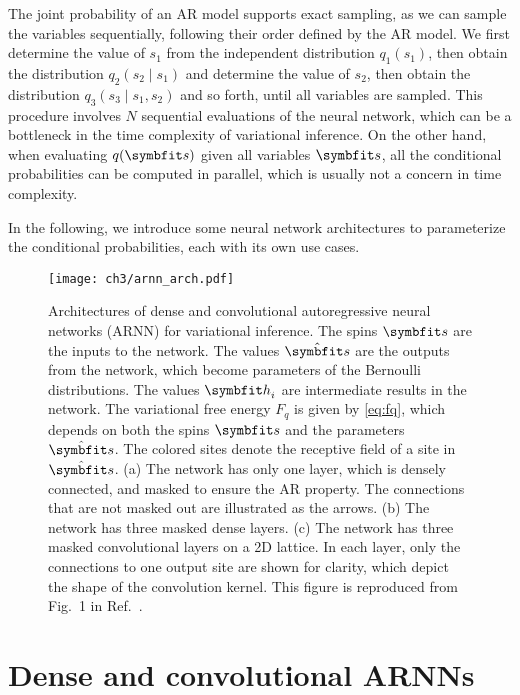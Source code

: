The joint probability of an AR model supports exact sampling, as we can sample the variables sequentially, following their order defined by the AR model. We first determine the value of $s_1$ from the independent distribution $q_1(s_1)$, then obtain the distribution $q_2(s_2 \mid s_1)$ and determine the value of $s_2$, then obtain the distribution $q_3(s_3 \mid s_1, s_2)$ and so forth, until all variables are sampled. This procedure involves $N$ sequential evaluations of the neural network, which can be a bottleneck in the time complexity of variational inference. On the other hand, when evaluating $q(\vs)$ given all variables $\vs$, all the conditional probabilities can be computed in parallel, which is usually not a concern in time complexity.

In the following, we introduce some neural network architectures to parameterize the conditional probabilities, each with its own use cases.

\begin{figure}[htb]
\centering
\texttt{[image: ch3/arnn\_arch.pdf]}
\caption[Architectures of autoregressive neural networks (ARNN)]{
Architectures of dense and convolutional autoregressive neural networks (ARNN) for variational inference.
The spins $\vs$ are the inputs to the network.
The values $\hat{\vs}$ are the outputs from the network, which become parameters of the Bernoulli distributions.
The values $\vh_i$ are intermediate results in the network.
The variational free energy $F_q$ is given by \cref{eq:fq}, which depends on both the spins $\vs$ and the parameters $\hat{\vs}$.
The colored sites denote the receptive field of a site in $\hat{\vs}$.
(a) The network has only one layer, which is densely connected, and masked to ensure the AR property. The connections that are not masked out are illustrated as the arrows.
(b) The network has three masked dense layers.
(c) The network has three masked convolutional layers on a 2D lattice. In each layer, only the connections to one output site are shown for clarity, which depict the shape of the convolution kernel.
This figure is reproduced from Fig.~1 in Ref.~\cite{wu2019solving}.
}
\label{fig:arnn-arch}
\end{figure}

\section{Dense and convolutional ARNNs}

